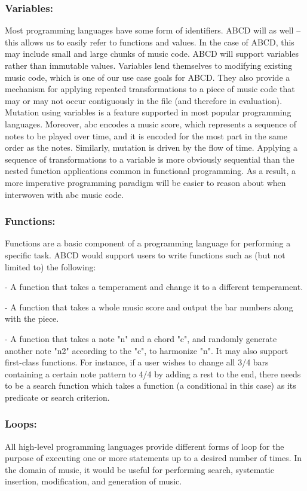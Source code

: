 	\subsubsection{Variables:}
	Most programming languages have some form of identifiers. ABCD will as well -- this allows us to easily refer to functions and values. In the case of ABCD, this may include small and large chunks of music code. ABCD will support variables rather than immutable values. Variables lend themselves to modifying existing music code, which is one of our use case goals for ABCD. They also provide a mechanism for applying repeated transformations to a piece of music code that may or may not occur contiguously in the file (and therefore in evaluation). Mutation using variables is a feature supported in most popular programming languages. Moreover, abc encodes a music score, which represents a sequence of notes to be played over time, and it is encoded for the most part in the same order as the notes. Similarly, mutation is driven by the flow of time. Applying a sequence of transformations to a variable is more obviously sequential than the nested function applications common in functional programming. As a result, a more imperative programming paradigm will be easier to reason about when interwoven with abc music code.

	\subsubsection{Functions:}
	Functions are a basic component of a programming language for performing a specific task. ABCD would support users to write functions such as (but not limited to) the following:

	- A function that takes a temperament and change it to a different temperament.

 	- A function that takes a whole music score and output the bar numbers along with the piece.
 	
	- A function that takes a note "n" and a chord "c", and randomly generate another note "n2" according to the "c", to harmonize "n".
	  It may also support first-class functions. For instance, if a user wishes to change all 3/4 bars containing a certain note pattern to 4/4 by adding a rest to the end, there needs to be a search function which takes a function (a conditional in this case) as its predicate or search criterion. 

	\subsubsection{Loops:}
	All high-level programming languages provide different forms of loop for the purpose of executing one or more statements up to a desired number of times. In the domain of music, it would be useful for performing search, systematic insertion, modification, and generation of music. 

